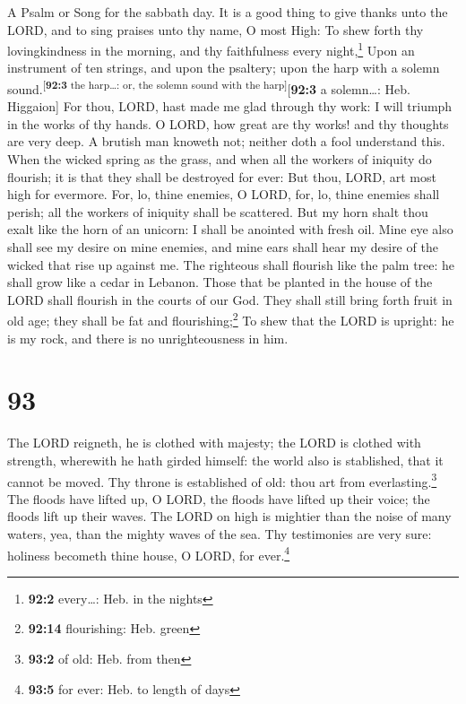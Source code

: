 A Psalm or Song for the sabbath day.  It is a good thing
to give thanks unto the LORD, and to sing praises unto thy name, O most
High:  To shew forth thy lovingkindness in the morning,
and thy faithfulness every night,\footnote{\textbf{92:2} every\ldots:
  Heb. in the nights}  Upon an instrument of ten strings,
and upon the psaltery; upon the harp with a solemn
sound.\textsuperscript{{[}\textbf{92:3} the harp\ldots: or, the solemn
sound with the harp{]}}{[}\textbf{92:3} a solemn\ldots: Heb. Higgaion{]}
 For thou, LORD, hast made me glad through thy work: I
will triumph in the works of thy hands.  O LORD, how great
are thy works! and thy thoughts are very deep.  A brutish
man knoweth not; neither doth a fool understand this. 
When the wicked spring as the grass, and when all the workers of
iniquity do flourish; it is that they shall be destroyed for ever:
 But thou, LORD, art most high for evermore.
 For, lo, thine enemies, O LORD, for, lo, thine enemies
shall perish; all the workers of iniquity shall be scattered.
 But my horn shalt thou exalt like the horn of an
unicorn: I shall be anointed with fresh oil.  Mine eye
also shall see my desire on mine enemies, and mine ears shall hear my
desire of the wicked that rise up against me.  The
righteous shall flourish like the palm tree: he shall grow like a cedar
in Lebanon.  Those that be planted in the house of the
LORD shall flourish in the courts of our God.  They shall
still bring forth fruit in old age; they shall be fat and
flourishing;\footnote{\textbf{92:14} flourishing: Heb. green}
 To shew that the LORD is upright: he is my rock, and
there is no unrighteousness in him.

\hypertarget{section-92}{%
\section{93}\label{section-92}}

 The LORD reigneth, he is clothed with majesty; the LORD
is clothed with strength, wherewith he hath girded himself: the world
also is stablished, that it cannot be moved.  Thy throne
is established of old: thou art from everlasting.\footnote{\textbf{93:2}
  of old: Heb. from then}  The floods have lifted up, O
LORD, the floods have lifted up their voice; the floods lift up their
waves.  The LORD on high is mightier than the noise of
many waters, yea, than the mighty waves of the sea.  Thy
testimonies are very sure: holiness becometh thine house, O LORD, for
ever.\footnote{\textbf{93:5} for ever: Heb. to length of days}

